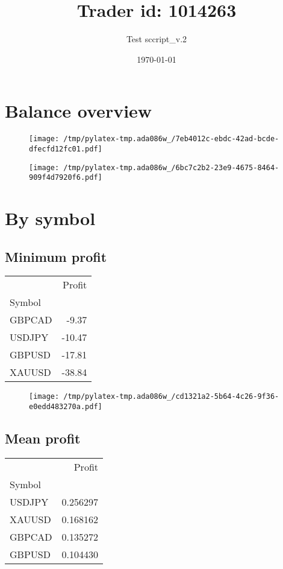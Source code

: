 \documentclass{article}%
\title{Trader id: 1014263}%
\author{Test sccript\_v.2}%
\date{\today}%
\begin{document}
%
\normalsize%
\maketitle%
\section{Balance overview}%
\label{sec:Balanceoverview}%


\begin{figure}[htbp]%
\centering%
\texttt{[image: /tmp/pylatex-tmp.ada086w\_/7eb4012c-ebdc-42ad-bcde-dfecfd12fc01.pdf]}%
\end{figure}

%


\begin{figure}[htbp]%
\centering%
\texttt{[image: /tmp/pylatex-tmp.ada086w\_/6bc7c2b2-23e9-4675-8464-909f4d7920f6.pdf]}%
\end{figure}

%
\section{By symbol}%
\label{sec:Bysymbol}%
\subsection{Minimum profit }%
\label{subsec:Minimumprofit}%
\begin{tabular}{lr}
\toprule
{} &  Profit \\
Symbol &         \\
\midrule
GBPCAD &   -9.37 \\
USDJPY &  -10.47 \\
GBPUSD &  -17.81 \\
XAUUSD &  -38.84 \\
\bottomrule
\end{tabular}
%


\begin{figure}[htbp]%
\centering%
\texttt{[image: /tmp/pylatex-tmp.ada086w\_/cd1321a2-5b64-4c26-9f36-e0edd483270a.pdf]}%
\end{figure}

%
\newpage %
\subsection{Mean profit }%
\label{subsec:Meanprofit}%
\begin{tabular}{lr}
\toprule
{} &    Profit \\
Symbol &           \\
\midrule
USDJPY &  0.256297 \\
XAUUSD &  0.168162 \\
GBPCAD &  0.135272 \\
GBPUSD &  0.104430 \\
\bottomrule
\end{tabular}
%
\end{document}
